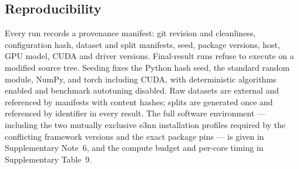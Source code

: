 \subsection*{Reproducibility}

Every run records a provenance manifest: git revision and cleanliness, configuration hash, dataset and split manifests, seed, package versions, host, GPU model, CUDA and driver versions. Final-result runs refuse to execute on a modified source tree. Seeding fixes the Python hash seed, the standard random module, NumPy, and torch including CUDA, with deterministic algorithms enabled and benchmark autotuning disabled. Raw datasets are external and referenced by manifests with content hashes; splits are generated once and referenced by identifier in every result. The full software environment --- including the two mutually exclusive e3nn installation profiles required by the conflicting framework versions and the exact package pins --- is given in Supplementary Note~6, and the compute budget and per-core timing in Supplementary Table~9.
